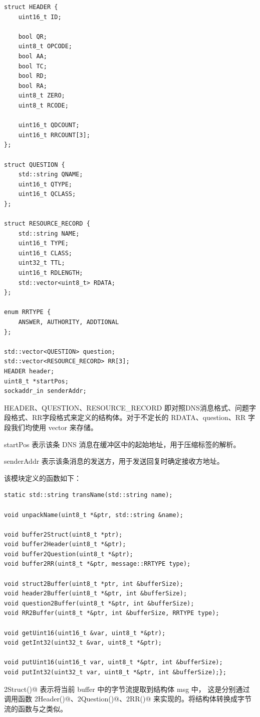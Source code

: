 \documentclass[]{article}
\begin{document}
        \begin{lstlisting}
struct HEADER {
    uint16_t ID;

    bool QR;
    uint8_t OPCODE;
    bool AA;
    bool TC;
    bool RD;
    bool RA;
    uint8_t ZERO;
    uint8_t RCODE;

    uint16_t QDCOUNT;
    uint16_t RRCOUNT[3];
};

struct QUESTION {
    std::string QNAME;
    uint16_t QTYPE;
    uint16_t QCLASS;
};        

struct RESOURCE_RECORD {
    std::string NAME;
    uint16_t TYPE;
    uint16_t CLASS;
    uint32_t TTL;
    uint16_t RDLENGTH;
    std::vector<uint8_t> RDATA;
};

enum RRTYPE {
    ANSWER, AUTHORITY, ADDTIONAL
};

std::vector<QUESTION> question;
std::vector<RESOURCE_RECORD> RR[3];
HEADER header;
uint8_t *startPos;
sockaddr_in senderAddr;
        \end{lstlisting}

        HEADER、QUESTION、RESOURCE\_RECORD 即对照DNS消息格式、问题字段格式、RR字段格式来定义的结构体。对于不定长的 RDATA、question、RR 字段我们均使用 vector 来存储。

        startPos 表示该条 DNS 消息在缓冲区中的起始地址，用于压缩标签的解析。

        senderAddr 表示该条消息的发送方，用于发送回复时确定接收方地址。

        该模块定义的函数如下：
        \begin{lstlisting}
static std::string transName(std::string name);

void unpackName(uint8_t *&ptr, std::string &name);

void buffer2Struct(uint8_t *ptr);
void buffer2Header(uint8_t *&ptr);
void buffer2Question(uint8_t *&ptr);
void buffer2RR(uint8_t *&ptr, message::RRTYPE type);

void struct2Buffer(uint8_t *ptr, int &bufferSize);
void header2Buffer(uint8_t *&ptr, int &bufferSize);
void question2Buffer(uint8_t *&ptr, int &bufferSize);
void RR2Buffer(uint8_t *&ptr, int &bufferSize, RRTYPE type);

void getUint16(uint16_t &var, uint8_t *&ptr);
void getInt32(uint32_t &var, uint8_t *&ptr);

void putUint16(uint16_t var, uint8_t *&ptr, int &bufferSize);
void putInt32(uint32_t var, uint8_t *&ptr, int &bufferSize);};
        \end{lstlisting}

        \verb@buffer2Struct()@ 表示将当前 buffer 中的字节流提取到结构体 msg 中，
        这是分别通过调用函数 \verb@buffer2Header()@、\verb@buffer2Question()@、\verb@buffer2RR()@ 来实现的。将结构体转换成字节流的函数与之类似。
\end{document}
